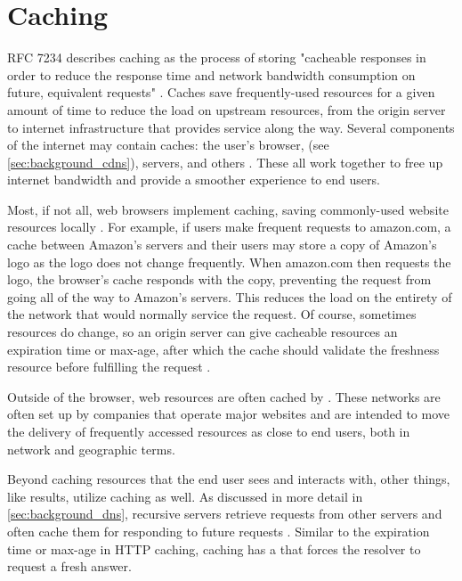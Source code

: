 \section{Caching}\label{sec:background_caching}

RFC 7234 describes caching as the process of storing "cacheable responses in order to reduce the response time and network bandwidth consumption on future, equivalent requests" \cite{rfc7234}. Caches save frequently-used resources for a given amount of time to reduce the load on upstream resources, from the origin server to internet infrastructure that provides service along the way. Several components of the internet may contain caches: the user's browser, \cdns (see \cref{sec:background_cdns}), \dns servers, and others \cite{MozillaFoundation2019HTTPCaching}. These all work together to free up internet bandwidth and provide a smoother experience to end users.

Most, if not all, web browsers implement \http caching, saving commonly-used website resources locally \cite{Grigorik2019HTTPCaching}. For example, if users make frequent requests to amazon.com, a cache between Amazon's servers and their users may store a copy of Amazon's logo as the logo does not change frequently. When amazon.com then requests the logo, the browser's cache responds with the copy, preventing the request from going all of the way to Amazon's servers. This reduces the load on the entirety of the network that would normally service the request. Of course, sometimes resources do change, so an origin server can give cacheable resources an expiration time or max-age, after which the cache should validate the freshness resource before fulfilling the request \cite{rfc7234}. 

Outside of the browser, web resources are often cached by \cdns. These networks are often set up by companies that operate major websites and are intended to move the delivery of frequently accessed resources as close to end users, both in network and geographic terms.

Beyond caching resources that the end user sees and interacts with, other things, like \dns results, utilize caching as well. As discussed in more detail in \autoref{sec:background_dns}, recursive \dns servers retrieve requests from other \dns servers and often cache them for responding to future requests \cite{rfc1035}. Similar to the expiration time or max-age in HTTP caching, \dns caching has a \ttl that forces the \dns resolver to request a fresh answer.